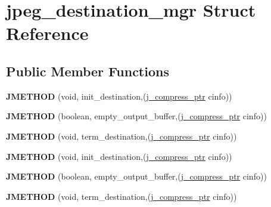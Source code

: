 \hypertarget{structjpeg__destination__mgr}{\section{jpeg\-\_\-destination\-\_\-mgr Struct Reference}
\label{structjpeg__destination__mgr}
}
\subsection*{Public Member Functions}
\begin{DoxyCompactItemize}
\item 
\hypertarget{structjpeg__destination__mgr_ae29d14eb632140c7c67eda8c5824383c}{{\bfseries J\-M\-E\-T\-H\-O\-D} (void, init\-\_\-destination,(\hyperlink{structjpeg__compress__struct}{j\-\_\-compress\-\_\-ptr} cinfo))}\label{structjpeg__destination__mgr_ae29d14eb632140c7c67eda8c5824383c}

\item 
\hypertarget{structjpeg__destination__mgr_a7357b5d5cab543cfa243dd59f101b8f2}{{\bfseries J\-M\-E\-T\-H\-O\-D} (boolean, empty\-\_\-output\-\_\-buffer,(\hyperlink{structjpeg__compress__struct}{j\-\_\-compress\-\_\-ptr} cinfo))}\label{structjpeg__destination__mgr_a7357b5d5cab543cfa243dd59f101b8f2}

\item 
\hypertarget{structjpeg__destination__mgr_a1158df5e49ecfa2a7d0905eef216afbf}{{\bfseries J\-M\-E\-T\-H\-O\-D} (void, term\-\_\-destination,(\hyperlink{structjpeg__compress__struct}{j\-\_\-compress\-\_\-ptr} cinfo))}\label{structjpeg__destination__mgr_a1158df5e49ecfa2a7d0905eef216afbf}

\item 
\hypertarget{structjpeg__destination__mgr_ae29d14eb632140c7c67eda8c5824383c}{{\bfseries J\-M\-E\-T\-H\-O\-D} (void, init\-\_\-destination,(\hyperlink{structjpeg__compress__struct}{j\-\_\-compress\-\_\-ptr} cinfo))}\label{structjpeg__destination__mgr_ae29d14eb632140c7c67eda8c5824383c}

\item 
\hypertarget{structjpeg__destination__mgr_a7357b5d5cab543cfa243dd59f101b8f2}{{\bfseries J\-M\-E\-T\-H\-O\-D} (boolean, empty\-\_\-output\-\_\-buffer,(\hyperlink{structjpeg__compress__struct}{j\-\_\-compress\-\_\-ptr} cinfo))}\label{structjpeg__destination__mgr_a7357b5d5cab543cfa243dd59f101b8f2}

\item 
\hypertarget{structjpeg__destination__mgr_a1158df5e49ecfa2a7d0905eef216afbf}{{\bfseries J\-M\-E\-T\-H\-O\-D} (void, term\-\_\-destination,(\hyperlink{structjpeg__compress__struct}{j\-\_\-compress\-\_\-ptr} cinfo))}\label{structjpeg__destination__mgr_a1158df5e49ecfa2a7d0905eef216afbf}

\end{DoxyCompactItemize}
